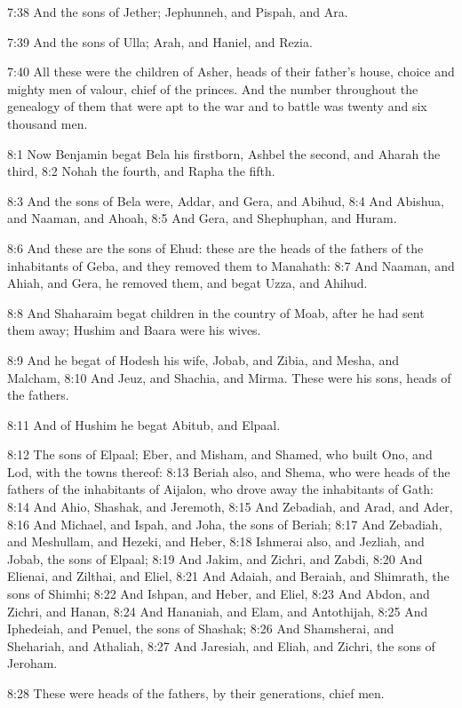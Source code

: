 7:38 And the sons of Jether; Jephunneh, and Pispah, and Ara.

7:39 And the sons of Ulla; Arah, and Haniel, and Rezia.

7:40 All these were the children of Asher, heads of their father's
house, choice and mighty men of valour, chief of the princes. And the
number throughout the genealogy of them that were apt to the war and
to battle was twenty and six thousand men.

8:1 Now Benjamin begat Bela his firstborn, Ashbel the second, and
Aharah the third, 8:2 Nohah the fourth, and Rapha the fifth.

8:3 And the sons of Bela were, Addar, and Gera, and Abihud, 8:4 And
Abishua, and Naaman, and Ahoah, 8:5 And Gera, and Shephuphan, and
Huram.

8:6 And these are the sons of Ehud: these are the heads of the fathers
of the inhabitants of Geba, and they removed them to Manahath: 8:7 And
Naaman, and Ahiah, and Gera, he removed them, and begat Uzza, and
Ahihud.

8:8 And Shaharaim begat children in the country of Moab, after he had
sent them away; Hushim and Baara were his wives.

8:9 And he begat of Hodesh his wife, Jobab, and Zibia, and Mesha, and
Malcham, 8:10 And Jeuz, and Shachia, and Mirma. These were his sons,
heads of the fathers.

8:11 And of Hushim he begat Abitub, and Elpaal.

8:12 The sons of Elpaal; Eber, and Misham, and Shamed, who built Ono,
and Lod, with the towns thereof: 8:13 Beriah also, and Shema, who were
heads of the fathers of the inhabitants of Aijalon, who drove away the
inhabitants of Gath: 8:14 And Ahio, Shashak, and Jeremoth, 8:15 And
Zebadiah, and Arad, and Ader, 8:16 And Michael, and Ispah, and Joha,
the sons of Beriah; 8:17 And Zebadiah, and Meshullam, and Hezeki, and
Heber, 8:18 Ishmerai also, and Jezliah, and Jobab, the sons of Elpaal;
8:19 And Jakim, and Zichri, and Zabdi, 8:20 And Elienai, and Zilthai,
and Eliel, 8:21 And Adaiah, and Beraiah, and Shimrath, the sons of
Shimhi; 8:22 And Ishpan, and Heber, and Eliel, 8:23 And Abdon, and
Zichri, and Hanan, 8:24 And Hananiah, and Elam, and Antothijah, 8:25
And Iphedeiah, and Penuel, the sons of Shashak; 8:26 And Shamsherai,
and Shehariah, and Athaliah, 8:27 And Jaresiah, and Eliah, and Zichri,
the sons of Jeroham.

8:28 These were heads of the fathers, by their generations, chief men.

